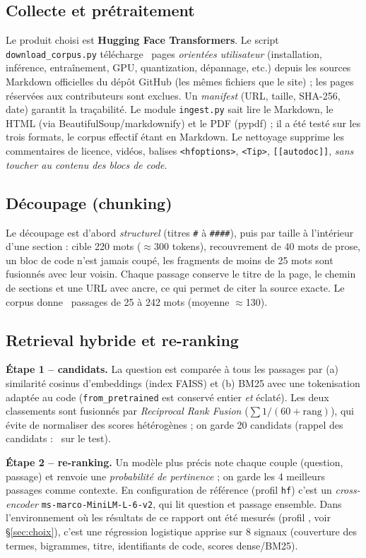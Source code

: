 \documentclass[11pt,a4paper]{article}
\newcommand{\code}[1]{\texttt{\small #1}}
\begin{document}
\subsection{Collecte et pr\'etraitement}
Le produit choisi est \textbf{Hugging Face Transformers}. Le script \code{download\_corpus.py} t\'el\'echarge \NDocs\ pages \emph{orient\'ees utilisateur} (installation, inf\'erence, entra\^inement, GPU, quantization, d\'epannage, etc.) depuis les sources Markdown officielles du d\'epôt GitHub (les m\^emes fichiers que le site) ; les pages r\'eserv\'ees aux contributeurs sont exclues. Un \emph{manifest} (URL, taille, SHA-256, date) garantit la tra\c cabilit\'e. Le module \code{ingest.py} sait lire le Markdown, le HTML (via BeautifulSoup/markdownify) et le PDF (pypdf) ; il a \'et\'e test\'e sur les trois formats, le corpus effectif \'etant en Markdown. Le nettoyage supprime les commentaires de licence, vid\'eos, balises \code{<hfoptions>}, \code{<Tip>}, \code{[[autodoc]]}, \emph{sans toucher au contenu des blocs de code}.

\subsection{D\'ecoupage (chunking)}
Le d\'ecoupage est d'abord \emph{structurel} (titres \code{\#} \`a \code{\#\#\#\#}), puis par taille \`a l'int\'erieur d'une section : cible 220 mots (\(\approx\)300 tokens), recouvrement de 40 mots de prose, un bloc de code n'est jamais coup\'e, les fragments de moins de 25 mots sont fusionn\'es avec leur voisin. Chaque passage conserve le titre de la page, le chemin de sections et une URL avec ancre, ce qui permet de citer la source exacte. Le corpus donne \NChunks\ passages de 25 \`a 242 mots (moyenne \(\approx\)130).

\subsection{Retrieval hybride et re-ranking}
\textbf{\'Etape 1 -- candidats.} La question est compar\'ee \`a tous les passages par (a) similarit\'e cosinus d'embeddings (index FAISS) et (b) BM25 avec une tokenisation adapt\'ee au code (\code{from\_pretrained} est conserv\'e entier \emph{et} \'eclat\'e). Les deux classements sont fusionn\'es par \emph{Reciprocal Rank Fusion} ($\sum 1/(60+\text{rang})$), qui \'evite de normaliser des scores h\'et\'erog\`enes ; on garde 20 candidats (rappel des candidats : \CandRecall\ sur le test).

\textbf{\'Etape 2 -- re-ranking.} Un mod\`ele plus pr\'ecis note chaque couple (question, passage) et renvoie une \emph{probabilit\'e de pertinence} ; on garde les 4 meilleurs passages comme contexte. En configuration de r\'ef\'erence (profil \code{hf}) c'est un \emph{cross-encoder} \code{ms-marco-MiniLM-L-6-v2}, qui lit question et passage ensemble. Dans l'environnement o\`u les r\'esultats de ce rapport ont \'et\'e mesur\'es (profil \code{\ProfileName}, voir \S\ref{sec:choix}), c'est une r\'egression logistique apprise sur 8 signaux (couverture des termes, bigrammes, titre, identifiants de code, scores dense/BM25).
\end{document}
